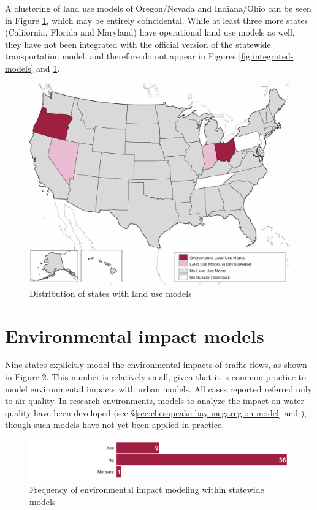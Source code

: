 A clustering of land use models of Oregon/Nevada and Indiana/Ohio can be seen in Figure \ref{fig:land-use-model-states}, which may be entirely coincidental. While at least three more states (California, Florida and Maryland) have operational land use models as well, they have not been integrated with the official version of the statewide transportation model, and therefore do not appear in Figures \ref{fig:integrated-models} and \ref{fig:land-use-model-states}.

\begin{figure}   %
\centering
\includegraphics[width=6.5in]{graphics/31-land-use-model-states}
\caption{Distribution of states with land use models}
\label{fig:land-use-model-states}
\end{figure}

\section{Environmental impact models}

Nine states explicitly model the environmental impacts of traffic flows, as shown in Figure \ref{fig:environmental-model-frequency}. This number is relatively small, given that it is common practice to model environmental impacts with urban models. All cases reported referred only to air quality. In research environments, models to analyze the impact on water quality have been developed (see \S\ref{sec:chesapeake-bay-megaregion-model} and \cite{baker07}), though such models have not yet been applied in practice.

\begin{figure}   %
\centering
\includegraphics[width=6.4in]{graphics/32-environmental-model-frequency}
\caption{Frequency of environmental impact modeling within statewide models}
\label{fig:environmental-model-frequency}
\end{figure}

